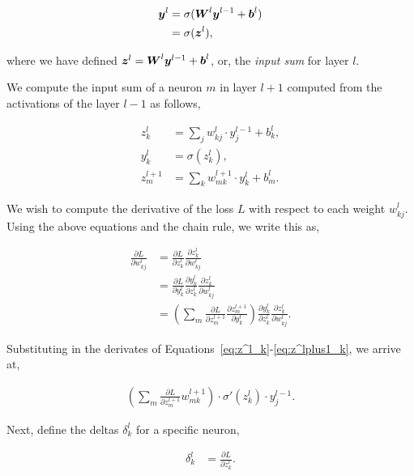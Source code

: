 \begin{align}
    {\boldsymbol{{y}}}^l &= \sigma({\boldsymbol{{W}}}^l {\boldsymbol{{y}}}^{l-1} + {\boldsymbol{{b}}}^l) \\
              &= \sigma({\boldsymbol{{z}}}^l),
\end{align}

where we have defined \({\boldsymbol{{z}}}^l = {\boldsymbol{{W}}}^l {\boldsymbol{{y}}}^{l-1} + {\boldsymbol{{b}}}^l\), or, the \textit{input sum} for layer \(l\).

We compute the input sum of a neuron \(m\) in layer \(l+1\) computed from the activations of the layer \(l-1\) as follows,

\begin{align}
    z^l_k &= \sum_{j} w^l_{kj} \cdot y^{l-1}_j + b^l_k,\label{eq:z^l_k} \\
    y^l_k &= \sigma (z^l_k),\label{eq:a^l_l} \\
    z^{l+1}_m &= \sum_{k} w^{l+1}_{mk} \cdot y^l_k + b^l_m.\label{eq:z^lplus1_k}
\end{align}

We wish to compute the derivative of the loss \(L\) with respect to each weight \(w^l_{kj}\). Using the above equations and the chain rule, we write this as,

\begin{align}
    \frac{\partial L}{\partial w^l_{kj}} &= \frac{\partial L}{\partial z^l_k} \frac{\partial z^l_k}{\partial w^l_{kj}} \\
    &= \frac{\partial L}{\partial y^l_k} \frac{\partial y^l_k}{\partial z^l_k} \frac{\partial z^l_k}{\partial w^l_{kj}} \\
    &= \left(
        \sum_{m} \frac{\partial L}{\partial z^{l+1}_m} \frac{\partial z^{l+1}_m}{\partial y^l_k}
    \right)
    \frac{\partial y^l_k}{\partial z^l_k} \frac{\partial z^l_k}{\partial w^l_{kj}}.
\end{align}

Substituting in the derivates of Equations~\ref{eq:z^l_k}-\ref{eq:z^lplus1_k}, we arrive at,

\begin{align}
    \left(
        \sum_{m} \frac{\partial L}{\partial z^{l+1}_m} w^{l+1}_{mk}
    \right) \cdot
    \sigma'(z^l_k) \cdot
    y^{l-1}_j.
\end{align}

Next, define the deltas \(\delta^l_k\) for a specific neuron,

\begin{align}
    \delta^l_k &= \frac{\partial L}{\partial z^l_k}. \label{eq:delta^l_k}
\end{align}

